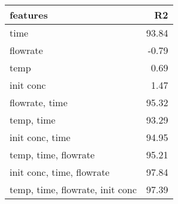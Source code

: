 \begin{longtable}{lr}
\hline
 features                        &    R2 \\
\hline
 time                            & 93.84 \\
 flowrate                        & -0.79 \\
 temp                            &  0.69 \\
 init conc                       &  1.47 \\
 flowrate, time                  & 95.32 \\
 temp, time                      & 93.29 \\
 init conc, time                 & 94.95 \\
 temp, time, flowrate            & 95.21 \\
 init conc, time, flowrate       & 97.84 \\
 temp, time, flowrate, init conc & 97.39 \\
\hline
\end{longtable}
